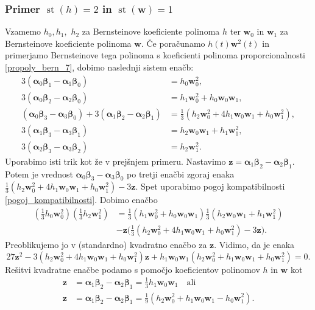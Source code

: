 \documentclass[12pt,a4paper,twoside]{article}
\theoremstyle{definition} %
\theoremstyle{plain} %
\theoremstyle{primerstyle}
\numberwithin{equation}{section}  %
\newcommand{\wV}{\mathbf{w}}
\newcommand{\zV}{\mathbf{z}}
\newcommand{\balpha}{\boldsymbol \alpha}
\newcommand{\bbeta}{\boldsymbol \beta}
\DeclareMathOperator{\st}{st}
\begin{document}
\subsubsection{Primer \texorpdfstring{$\st(h)=2$}{st(h)=2} in \texorpdfstring{$\st(\wV)=1$}{st(w)=1}}
\label{klasifikacija_h2w1}

Vzamemo $h_0,h_1,$ $h_2$ za Bernsteinove koeficiente polinoma $h$ ter $\wV_0$ in $\wV_1$ za Bernsteinove koeficiente polinoma $\wV.$ Če poračunamo $h(t)\wV^2(t)$ in primerjamo Bernsteinove tega polinoma s koeficienti polinoma proporcionalnosti \eqref{propoly_bern_7}, dobimo naslednji sistem enačb:
\begin{align}
	3(\balpha_0\bbeta_1-\balpha_1\bbeta_0)&=h_0\wV_0^2,\nonumber\\
	3(\balpha_0\bbeta_2-\balpha_2\bbeta_0)&=h_1\wV_0^2+h_0\wV_0\wV_1,\nonumber\\
	(\balpha_0\bbeta_3-\balpha_3\bbeta_0)+3(\balpha_1\bbeta_2-\balpha_2\bbeta_1)&=\frac{1}{3}(h_2\wV_0^2+4h_1\wV_0\wV_1+h_0\wV_1^2),\label{sistem_st7h2w1}\\
	3(\balpha_1\bbeta_3-\balpha_3\bbeta_1)&=h_2\wV_0\wV_1+h_1\wV_1^2,\nonumber\\
	3(\balpha_2\bbeta_3-\balpha_3\bbeta_2)&=h_2\wV_1^2.\nonumber
\end{align}
Uporabimo isti trik kot že v prejšnjem primeru. Nastavimo $\zV=\balpha_1\bbeta_2-\balpha_2\bbeta_1.$ Potem je vrednost $\balpha_0\bbeta_3-\balpha_3\bbeta_0$ po tretji enačbi zgoraj enaka $\frac{1}{3}(h_2\wV_0^2+4h_1\wV_0\wV_1+h_0\wV_1^2)-3\zV.$ Spet uporabimo pogoj kompatibilnosti \eqref{pogoj_kompatibilnosti}. Dobimo enačbo
\begin{align*}
	\left(\frac{1}{3}h_0\wV_0^2\right)\left(\frac{1}{3}h_2\wV_1^2\right)&=\frac{1}{3}(h_1\wV_0^2+h_0\wV_0\wV_1)\frac{1}{3}(h_2\wV_0\wV_1+h_1\wV_1^2)\nonumber\\
	&-\zV\Big(\frac{1}{3}(h_2\wV_0^2+4h_1\wV_0\wV_1+h_0\wV_1^2)-3\zV\Big).
\end{align*}
Preoblikujemo jo v (standardno) kvadratno enačbo za $\zV.$ Vidimo, da je enaka
\begin{equation*}
	27\zV^2-3(h_2\wV_0^2+4h_1\wV_0\wV_1+h_0\wV_1^2)\zV+h_1\wV_0\wV_1(h_2\wV_0^2+h_1\wV_0\wV_1+h_0\wV_1^2)=0.
\end{equation*}
Rešitvi kvadratne enačbe podamo s pomočjo koeficientov polinomov $h$ in $\wV$ kot
\begin{align}
	\zV&=\balpha_1\bbeta_2-\balpha_2\bbeta_1=\frac{1}{3}h_1\wV_0\wV_1\quad\text{ali}\nonumber\\
	\zV&=\balpha_1\bbeta_2-\balpha_2\bbeta_1=\frac{1}{9}(h_2\wV_0^2+h_1\wV_0\wV_1-h_0\wV_1^2).\label{st7h2w1}
\end{align}
\end{document}

